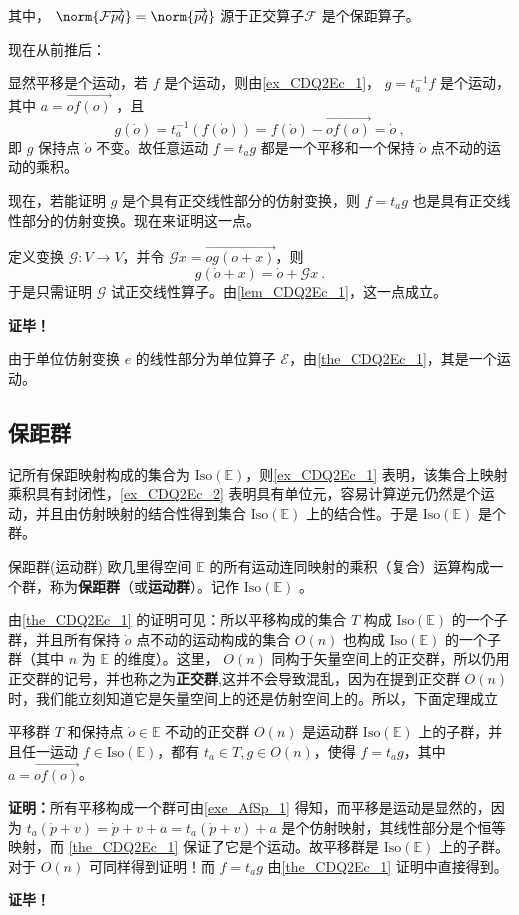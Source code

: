 其中， $\norm{\mathcal F\overrightarrow{pq}}=\norm{\overrightarrow{pq}}$ 源于正交算子$\mathcal F$ 是个保距算子。 %

现在从前推后：

显然平移是个运动，若 $f$ 是个运动，则由\autoref{ex_CDQ2Ec_1}， $g=t_a^{-1} f$ 是个运动，其中 $a=\overrightarrow{of(o)}$ ，且
\begin{equation}
g(\dot o)=t_a^{-1}(f(\dot o))=f(\dot o)-\overrightarrow{of(o)}=\dot o~,
\end{equation}
即 $g$ 保持点 $\dot o$ 不变。故任意运动 $f=t_ag$ 都是一个平移和一个保持 $\dot o$ 点不动的运动的乘积。

现在，若能证明 $g$ 是个具有正交线性部分的仿射变换，则 $f=t_a g$ 也是具有正交线性部分的仿射变换。现在来证明这一点。

定义变换 $\mathcal G:V\rightarrow V$，并令 $\mathcal G x=\overrightarrow{og(o+x)}$，则
\begin{equation}\label{eq_CDQ2Ec_1}
g(\dot o+x)=\dot o+\mathcal G x~.
\end{equation}
于是只需证明 $\mathcal G$ 试正交线性算子。由\autoref{lem_CDQ2Ec_1}，这一点成立。

\textbf{证毕！}
\begin{example}{}\label{ex_CDQ2Ec_2}
由于单位仿射变换 $e$ 的线性部分为单位算子 $\mathcal E$，由\autoref{the_CDQ2Ec_1}，其是一个运动。
\end{example}
\subsection{保距群}
记所有保距映射构成的集合为 $\mathrm{Iso(\mathbb E)}$，则\autoref{ex_CDQ2Ec_1} 表明，该集合上映射乘积具有封闭性，\autoref{ex_CDQ2Ec_2} 表明具有单位元，容易计算逆元仍然是个运动，并且由仿射映射的结合性得到集合 $\mathrm{Iso(\mathbb E)}$ 上的结合性。于是 $\mathrm{Iso}(\mathbb E)$ 是个群。
\begin{definition}{保距群(运动群)}
欧几里得空间 $\mathbb E$ 的所有运动连同映射的乘积（复合）运算构成一个群，称为\textbf{保距群}（或\textbf{运动群}）。记作 $\mathrm{Iso(\mathbb E)}$ 。
\end{definition}
由\autoref{the_CDQ2Ec_1} 的证明可见：所以平移构成的集合 $T$ 构成 $\mathrm{Iso}(\mathbb E)$ 的一个子群，并且所有保持 $\dot o$ 点不动的运动构成的集合 $O(n)$ 也构成 $\mathrm{Iso}(\mathbb E)$ 的一个子群（其中 $n$ 为 $\mathbb E$ 的维度）。这里， $O(n)$ 同构于矢量空间上的正交群，所以仍用正交群的记号，并也称之为\textbf{正交群},这并不会导致混乱，因为在提到正交群 $O(n)$ 时，我们能立刻知道它是矢量空间上的还是仿射空间上的。所以，下面定理成立
\begin{theorem}{}
平移群 $T$ 和保持点 $\dot o\in\mathbb E$ 不动的正交群 $O(n)$ 是运动群 $\mathrm{Iso(\mathbb E)}$ 上的子群，并且任一运动 $f\in\mathrm{Iso(\mathbb E)}$，都有 $t_a\in T,g\in O(n)$，使得 $f=t_ag$，其中 $a=\overrightarrow{of(o)}$。
\end{theorem}
\textbf{证明：}所有平移构成一个群可由\autoref{exe_AfSp_1}  得知，而平移是运动是显然的，因为 $t_a(\dot p+v)=\dot p+v+a=t_a(\dot p+v)+a$ 是个仿射映射，其线性部分是个恒等映射，而 \autoref{the_CDQ2Ec_1} 保证了它是个运动。故平移群是 $\mathrm{Iso(\mathbb E)}$ 上的子群。对于 $O(n)$ 可同样得到证明！而 $f=t_ag$ 由\autoref{the_CDQ2Ec_1} 证明中直接得到。

\textbf{证毕！}
